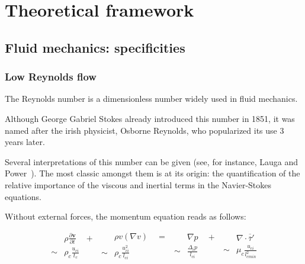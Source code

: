 \chapter{Theoretical framework}
\label{theory}

\section{Fluid mechanics: specificities}
\label{fluid_mechanics}

\subsection{Low Reynolds flow}
\label{low_reynolds}

The Reynolds number is a dimensionless number widely used in fluid mechanics.

Although George Gabriel Stokes already introduced this number in 1851, it was named after the irish physicist, Osborne Reynolds, who popularized its use 3 years later.

Several interpretations of this number can be given (see, for instance, Lauga and Power~\cite{Lauga}). The most classic amongst them is at its origin: the quantification of the relative importance of the viscous and inertial terms in the Navier-Stokes equations.

Without external forces, the momentum equation reads as follows:

\begin{equation}
\begin{aligned}
& \rho \frac{\partial \mathbf{v}}{\partial t} \quad + \\
\sim & \rho_c \frac{u_{ci}}{t_c} 
\end{aligned}
\begin{aligned}
& \rho v (\nabla v) \quad = \\
\sim & \rho_c \frac{u_{ci}^2}{l_{ci}}
\end{aligned}
\begin{aligned}
& \nabla p \quad + \\
\sim & \frac{\Delta_i p}{l_{ci}}
\end{aligned}
\begin{aligned}
& \nabla \cdot \overline{\overline\tau}' \\
\sim & \mu_c \frac{u_{ci}}{l_{cmin}^2}
\end{aligned}
\label{CDM}
\end{equation}

